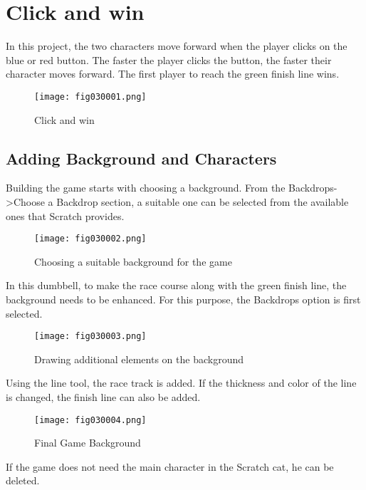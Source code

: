\chapter{Click and win}

In this project, the two characters move forward when the player clicks on the blue or red button. The faster the player clicks the button, the faster their character moves forward. The first player to reach the green finish line wins.

\begin{figure}[H]
   \centering
   \texttt{[image: fig030001.png]}
   \caption{Click and win}
\label{fig030001}
\end{figure}

\section{Adding Background and Characters}
Building the game starts with choosing a background. From the Backdrops->Choose a Backdrop section, a suitable one can be selected from the available ones that Scratch provides.

\begin{figure}[H]
   \centering
   \texttt{[image: fig030002.png]}
   \caption{Choosing a suitable background for the game}
\label{fig030002}
\end{figure}

In this dumbbell, to make the race course along with the green finish line, the background needs to be enhanced. For this purpose, the Backdrops option is first selected.

\begin{figure}[H]
   \centering
   \texttt{[image: fig030003.png]}
   \caption{Drawing additional elements on the background}
\label{fig030003}
\end{figure}

Using the line tool, the race track is added. If the thickness and color of the line is changed, the finish line can also be added.

\begin{figure}[H]
   \centering
   \texttt{[image: fig030004.png]}
   \caption{Final Game Background}
\label{fig030004}
\end{figure}

If the game does not need the main character in the Scratch cat, he can be deleted.

